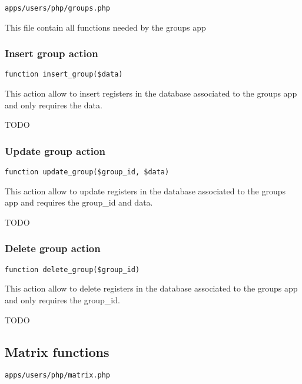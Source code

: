 \documentclass[a4paper]{article}
\begin{document}
\begin{lstlisting}
apps/users/php/groups.php
\end{lstlisting}

This file contain all functions needed by the groups app

\hypertarget{toc165}{}
\subsubsection{Insert group action}

\begin{lstlisting}
function insert_group($data)
\end{lstlisting}

This action allow to insert registers in the database associated to
the groups app and only requires the data.

TODO

\hypertarget{toc166}{}
\subsubsection{Update group action}

\begin{lstlisting}
function update_group($group_id, $data)
\end{lstlisting}

This action allow to update registers in the database associated to
the groups app and requires the group\_id and data.

TODO

\hypertarget{toc167}{}
\subsubsection{Delete group action}

\begin{lstlisting}
function delete_group($group_id)
\end{lstlisting}

This action allow to delete registers in the database associated to
the groups app and only requires the group\_id.

TODO

\hypertarget{toc168}{}
\subsection{Matrix functions}

\begin{lstlisting}
apps/users/php/matrix.php
\end{lstlisting}
\end{document}
